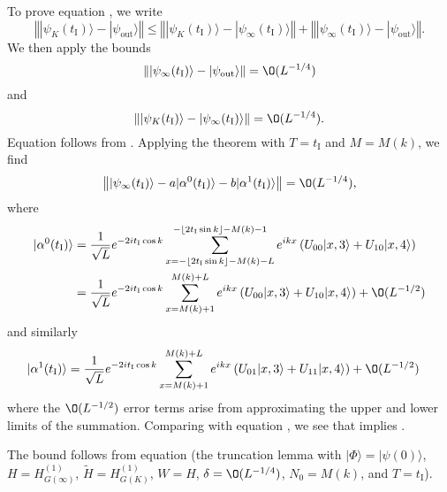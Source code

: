 \documentclass[../thesis-main/thesis-main]{subfiles}
\begin{document}
To prove equation , we write
\[
\left\Vert |\psi_{K}(t_{\mathrm{I}})\rangle-|\psi_{\text{out}}\rangle\right\Vert \leq\left\Vert |\psi_{K}(t_{\mathrm{I}})\rangle-|\psi_{\infty}(t_{\mathrm{I}})\rangle\right\Vert +\left\Vert |\psi_{\infty}(t_{\mathrm{I}})\rangle-|\psi_{\text{out}}\rangle\right\Vert .\]
We then apply the bounds
\begin{equation}
\left\Vert |\psi_{\infty}(t_{\mathrm{I}})\rangle-|\psi_{\text{out}}\rangle\right\Vert =\O(L^{-{1}/{4}})\label{eq:bound1}
\end{equation}
and
\begin{equation}
\left\Vert |\psi_{K}(t_{\mathrm{I}})\rangle-|\psi_{\infty}(t_{\mathrm{I}})\rangle\right\Vert =\O(L^{-{1}/{4}}).\label{eq:bound2}
\end{equation}
Equation  follows from .
Applying the theorem with $T=t_{\mathrm{I}}$ and $M=M(k)$, we find
\begin{equation}
\left\Vert |\psi_{\infty}(t_{\mathrm{I}})\rangle-a|\alpha^{0}(t_{\mathrm{I}})\rangle-b|\alpha^{1}(t_{\mathrm{I}})\rangle\right\Vert =\O(L^{-{1}/{4}}),\label{eq:bound_from_thm}
\end{equation}
where  
\begin{align*}
|\alpha^{0}(t_{\mathrm{I}})\rangle & =  \frac{1}{\sqrt{L}}e^{-2it_{\mathrm{I}}\cos k}\sum_{x = -\lfloor 2t_{\mathrm{I}} \sin k \rfloor-M(k)-L}^{-\lfloor 2t_{\mathrm{I}} \sin k \rfloor-M(k)-1}e^{ikx}\left(U_{00}|x,3\rangle+U_{10}|x,4\rangle\right) \\
& = \frac{1}{\sqrt{L}}e^{-2it_{\mathrm{I}}\cos k}\sum_{x=M(k)+1}^{M(k)+L}e^{ikx}\left(U_{00}|x,3\rangle+U_{10}|x,4\rangle\right) + \O(L^{-1/2})
\end{align*}
and similarly
\begin{align*}
|\alpha^{1}(t_{\mathrm{I}})\rangle & = \frac{1}{\sqrt{L}}e^{-2it_{\mathrm{I}}\cos k}\sum_{x=M(k)+1}^{M(k)+L}e^{ikx}\left(U_{01}|x,3\rangle+U_{11}|x,4\rangle\right) + \O(L^{-1/2})
\end{align*}
where the $\O(L^{-{1}/{2}})$ error terms arise from approximating the upper and lower limits of the summation. Comparing with equation , we see that  implies .

The bound  follows from equation  (the truncation lemma with $|\Phi\rangle  = |\psi(0)\rangle$, $H = H_{G(\infty)}^{(1)}$, $\tilde{H}  =  H_{G(K)}^{(1)}$, $W =  H$, $\delta = \O(L^{-{1}/{4}})$, $N_0 =  M(k)$, and $T = t_{\mathrm{I}}$).
\end{document}
